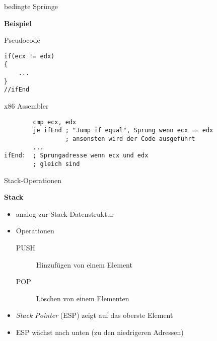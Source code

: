 \begin{frame}[fragile]{bedingte Sprünge}

\begin{center}
\textbf{Beispiel}
\end{center}

Pseudocode
\begin{lstlisting}
if(ecx != edx)
{
    ...
}
//ifEnd
\end{lstlisting}

x86 Assembler
\begin{lstlisting}
        cmp ecx, edx
        je ifEnd ; "Jump if equal", Sprung wenn ecx == edx
                 ; ansonsten wird der Code ausgeführt
        ...
ifEnd:  ; Sprungadresse wenn ecx und edx
        ; gleich sind
\end{lstlisting}
\end{frame}


\begin{frame}{Stack-Operationen}

\begin{center}
\textbf{Stack}
\end{center}

\begin{itemize}
    \item analog zur Stack-Datenstruktur

    \item Operationen
    \begin{description}
        \item [PUSH] Hinzufügen von einem Element

        \item [POP] Löschen von einem Elementen
    \end{description}

    \item \textit{Stack Pointer} (ESP) zeigt auf das oberste Element

    \item ESP wächst nach unten (zu den niedrigeren Adressen)
\end{itemize}
\end{frame}



